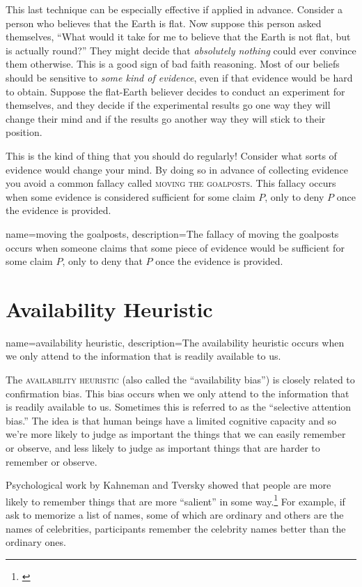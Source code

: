 This last technique can be especially effective if applied in advance. Consider a person who believes that the Earth is flat. Now suppose this person asked themselves, ``What would it take for me to believe that the Earth is not flat, but is actually round?'' They might decide that \emph{absolutely nothing} could ever convince them otherwise. This is a good sign of bad faith reasoning. Most of our beliefs should be sensitive to \emph{some kind of evidence}, even if that evidence would be hard to obtain. Suppose the flat-Earth believer decides to conduct an experiment for themselves, and they decide if the experimental results go one way they will change their mind and if the results go another way they will stick to their position.

This is the kind of thing that you should do regularly! Consider what sorts of evidence would change your mind. By doing so in advance of collecting evidence you avoid a common fallacy called \textsc{\gls{moving the goalposts}}. This fallacy occurs when some evidence is considered sufficient for some claim $P$, only to deny $P$ once the evidence is provided.

{
name=moving the goalposts,
description={The fallacy of moving the goalposts occurs when someone claims that some piece of evidence would be sufficient for some claim $P$, only to deny that $P$ once the evidence is provided.}
}

\section{Availability Heuristic}

{
name=availability heuristic,
description={The availability heuristic occurs when we only attend to the information that is readily available to us.}
}

The \textsc{\gls{availability heuristic}} (also called the ``availability bias'') is closely related to confirmation bias. This bias occurs when we only attend to the information that is readily available to us. Sometimes this is referred to as the ``selective attention bias.'' The idea is that human beings have a limited cognitive capacity and so we're more likely to judge as important the things that we can easily remember or observe, and less likely to judge as important things that are harder to remember or observe.

Psychological work by Kahneman and Tversky showed that people are more likely to remember things that are more ``salient'' in some way.\footnote{\cite{tversky1973}} For example, if ask to memorize a list of names, some of which are ordinary and others are the names of celebrities, participants remember the celebrity names better than the ordinary ones.

